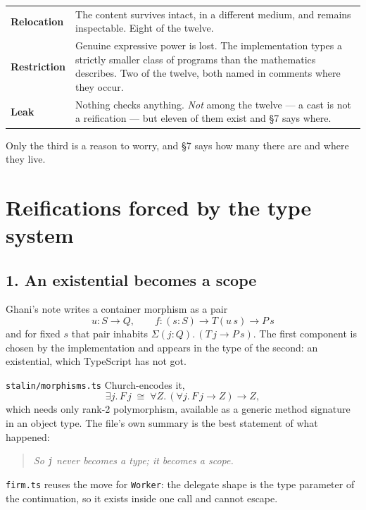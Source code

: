 \documentclass[11pt,a4paper]{article}
\begin{document}
\begin{center}
\begin{tabular}{@{}lp{9.4cm}@{}}
\toprule
\textbf{Relocation} & The content survives intact, in a different medium, and
remains inspectable. Eight of the twelve.\\
\addlinespace
\textbf{Restriction} & Genuine expressive power is lost. The implementation
types a strictly smaller class of programs than the mathematics describes. Two
of the twelve, both named in comments where they occur.\\
\addlinespace
\textbf{Leak} & Nothing checks anything. \emph{Not} among the twelve --- a cast
is not a reification --- but eleven of them exist and \S7 says where.\\
\bottomrule
\end{tabular}
\end{center}

Only the third is a reason to worry, and \S7 says how many there are and where
they live.

\section{Reifications forced by the type system}

\subsection*{1. An existential becomes a scope}

Ghani's note writes a container morphism as a pair
\[
  u : S \to Q, \qquad f : (s : S) \to T(u\,s) \to P\,s
\]
and for fixed $s$ that pair inhabits $\Sigma (j : Q).\, (T\,j \to P\,s)$. The
first component is chosen by the implementation and appears in the type of the
second: an existential, which TypeScript has not got.

\texttt{stalin/morphisms.ts} Church-encodes it,
\[
  \exists j.\, F\,j \;\cong\; \forall Z.\, (\forall j.\, F\,j \to Z) \to Z,
\]
which needs only rank-2 polymorphism, available as a generic method signature
in an object type. The file's own summary is the best statement of what
happened:

\begin{quote}
\emph{So \texttt{j} never becomes a type; it becomes a scope.}
\end{quote}

\texttt{firm.ts} reuses the move for \texttt{Worker}: the delegate shape is the
type parameter of the continuation, so it exists inside one call and cannot
escape.
\end{document}
